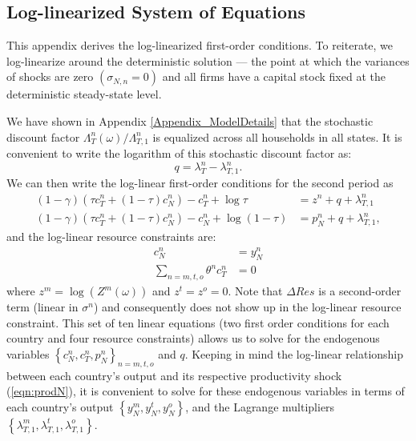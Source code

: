 \subsection{Log-linearized System of
  Equations \label{Appendix_Loglinear}}

This appendix derives the log-linearized first-order conditions. To
reiterate, we log-linearize around the deterministic solution --- the
point at which the variances of shocks are zero
$\left( \sigma_{N, n} = 0 \right)$ and all firms have a capital stock
fixed at the deterministic steady-state level.

We have shown in Appendix \ref{Appendix_ModelDetails} that the
stochastic discount factor $\Lambda^n_T(\omega) / \Lambda^n_{T, 1}$ is
equalized across all households in all states. It is convenient to
write the logarithm of this stochastic discount factor as:
\begin{equation*}
  q = \lambda^n_T - \lambda^n_{T, 1}.
\end{equation*}
We can then write the log-linear first-order conditions for the second
period as
\begin{align*} (1 - \gamma) \left( \tau c_T^n + (1 - \tau) c_N^n
  \right) - c_T^n + \log \tau
  & = z^n  + q + \lambda^n_{T, 1} \\
  (1 - \gamma) \left( \tau c_T^n + (1 - \tau) c_N^n \right) - c_N^n +
  \log(1 - \tau) &= p_N^n + q + \lambda^n_{T, 1},
\end{align*}
and the log-linear resource constraints are:
\begin{align*}
  c_N^n & =  y_N^n \\
  \sum_{n = m, t, o} \theta^n c_T^n  & = 0 
\end{align*}
where $z^m = \log \left( Z^m(\omega) \right)$ and \(z^t=z^o=0\). Note
that $\Delta Res$ is a second-order term (linear in $\sigma^n$) and
consequently does not show up in the log-linear resource constraint.
This set of ten linear equations (two first order conditions for each
country and four resource constraints) allows us to solve for the
endogenous variables
$\left\{c_N^n, c_T^n, p_N^n \right\}_{n = m, t, o}$ and $q$. Keeping
in mind the log-linear relationship between each country's output and
its respective productivity shock (\ref{eqn:prodN}), it is convenient
to solve for these endogenous variables in terms of each country's
output $\left\{ y_N^m, y_N^t, y_N^o\right\}$, and the Lagrange
multipliers
$\left\{\lambda_{T, 1}^m, \lambda_{T, 1}^t, \lambda_{T, 1}^o
\right\}$.

